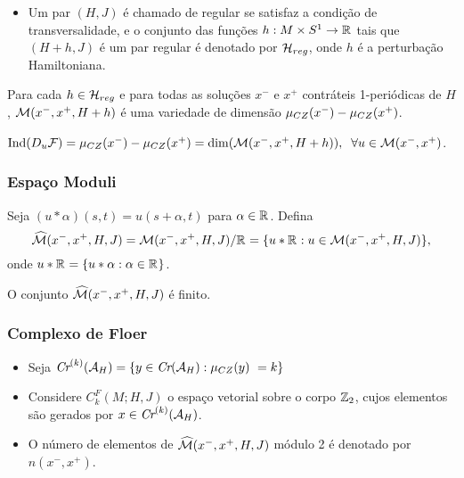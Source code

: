 \documentclass{beamer}
\begin{document}
\begin{footnotesize}
\begin{frame}
\begin{itemize}
			\item Um par $(H, J)$ é chamado de regular se satisfaz a condição de transversalidade, e o conjunto das funções $h:M\times S^{1} \to \mathbb{R}^{}$ tais que $(H+h,J)$ é um par regular é denotado por $\mathcal{H}_{reg}$, onde $h$ é a perturbação Hamiltoniana.
		\end{itemize}
		
		\begin{teorema}
			Para cada $h \in \mathcal{H}_{reg}$ e para todas as soluções $x^{-}$ e $x^{+}$ contráteis 1-periódicas de $H$, $\mathcal{M}(x^{-}, x^{+}, H+h)$ é uma variedade de dimensão $\mu_{CZ}(x^{-})-\mu_{CZ}(x^{+})$.
		\end{teorema}
		
		\begin{observacao}
			$	\text{Ind}{(D_{u}\mathcal{F})} = \mu_{CZ}(x^{-})-\mu_{CZ}(x^{+}) =\dim(\mathcal{M}(x^{-}, x^{+}, H+h)),\;\;\forall u \in \mathcal{M}(x^{-}, x^{+})$.
		\end{observacao}
	\end{frame}
	
	\begin{frame}
		\frametitle{Espaço Moduli}
		Seja $(u*\alpha)(s,t) = u(s+\alpha,t)$ para $\alpha \in \mathbb{R}^{}$.  Defina
		$$
		\widehat{\mathcal{M}}(x^{-}, x^{+}, H, J) = \mathcal{M}(x^{-},x^{+}, H, J)/\mathbb{R}^{}=\{u*\mathbb{R}^{}: u\in \mathcal{M}(x^{-},x^{+}, H, J)\},
		$$ 
		onde $u*\mathbb{R}^{} = \{u*\alpha:\alpha \in \mathbb{R}^{}\}$.
		
		\begin{teorema}
			O conjunto $\widehat{\mathcal{M}}(x^{-}, x^{+}, H, J)$ é finito.
		\end{teorema}
	\end{frame}
	
	\begin{frame}
		\frametitle{Complexo de Floer}
				
			\begin{itemize}
				\item Seja $
				\textit{Cr}^{(k)}(\mathcal{A}_{H}) = \{ y \in \textit{Cr}(\mathcal{A}_{H}): \mu_{CZ}(y) \ =	 k\}$
				
				\item Considere  $C^{F}_{k}(M;H,J)$ o espaço vetorial sobre o corpo $\mathbb{Z}_{2}$, cujos elementos são gerados por $x \in \textit{Cr}^{(k)}(\mathcal{A}_{H}) $.
				
				\item O número de elementos de $\widehat{\mathcal{M}}(x^{-}, x^{+}, H, J)$ módulo 2 é denotado por $n(x^{-},x^{+})$.
				

\end{itemize}
\end{frame}
\end{footnotesize}
\end{document}
